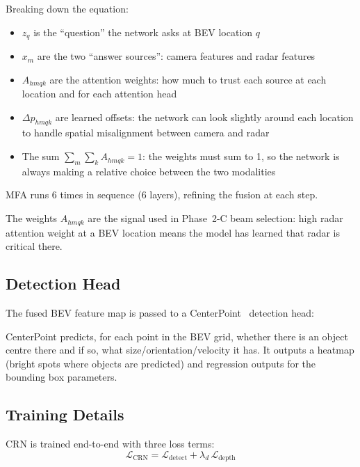 \documentclass[12pt, a4paper]{article}
\theoremstyle{definition}
\begin{document}
\begin{plainbox}
Breaking down the equation:
\begin{itemize}
  \item $z_q$ is the ``question'' the network asks at BEV location $q$
  \item $x_m$ are the two ``answer sources'': camera features and radar features
  \item $A_{hmqk}$ are the attention weights: how much to trust each source
        at each location and for each attention head
  \item $\Delta p_{hmqk}$ are learned offsets: the network can look slightly
        around each location to handle spatial misalignment between camera and radar
  \item The sum $\sum_m\sum_k A_{hmqk} = 1$: the weights must sum to 1,
        so the network is always making a relative choice between the two modalities
\end{itemize}
MFA runs 6 times in sequence (6 layers), refining the fusion at each step.
\end{plainbox}

The weights $A_{hmqk}$ are the signal used in Phase~2-C beam selection:
high radar attention weight at a BEV location means the model has learned that
radar is critical there.

\subsection{Detection Head}

The fused BEV feature map is passed to a CenterPoint~\cite{yin2021centerpoint}
detection head:

\begin{plainbox}
CenterPoint predicts, for each point in the BEV grid, whether there is an object
centre there and if so, what size/orientation/velocity it has.
It outputs a heatmap (bright spots where objects are predicted) and regression
outputs for the bounding box parameters.
\end{plainbox}

\subsection{Training Details}

CRN is trained end-to-end with three loss terms:
\begin{equation}
  \mathcal{L}_\mathrm{CRN}
  = \mathcal{L}_\mathrm{detect}
  + \lambda_d\,\mathcal{L}_\mathrm{depth}
  \label{eq:crn_total_loss}
\end{equation}
\end{document}
